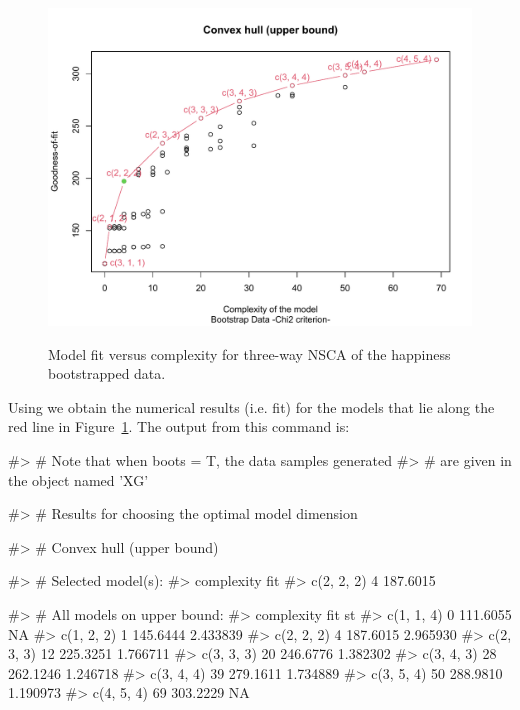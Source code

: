 \begin{figure}[h]
	\begin{center}
{\includegraphics*[width=1\textwidth]{figtunelocalnsca3n2.pdf}}
		\caption{\label{fig.tunelocal-nsca3} Model fit versus complexity for three-way NSCA of the happiness bootstrapped data.}
	\end{center}
\end{figure}

Using  we obtain the numerical results (i.e. fit) for the models that lie along the red line in Figure~\ref{fig.tunelocal-nsca3}. The output from this command is:
\begin{example}
#> # Note that when boots = T,  the data samples generated 
#> # are given in the object named 'XG' 

#> # Results for choosing the optimal model dimension

#> # Convex hull (upper bound)

#> # Selected model(s):
#>           complexity      fit
#> c(2, 2, 2)          4 187.6015


#> # All models on upper bound:
#>           complexity      fit       st
#> c(1, 1, 4)          0 111.6055       NA
#> c(1, 2, 2)          1 145.6444 2.433839
#> c(2, 2, 2)          4 187.6015 2.965930
#> c(2, 3, 3)         12 225.3251 1.766711
#> c(3, 3, 3)         20 246.6776 1.382302
#> c(3, 4, 3)         28 262.1246 1.246718
#> c(3, 4, 4)         39 279.1611 1.734889
#> c(3, 5, 4)         50 288.9810 1.190973
#> c(4, 5, 4)         69 303.2229       NA
\end{example}


